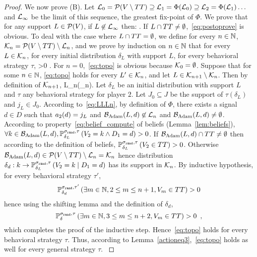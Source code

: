 \begin{proof}
We now prove (B).
Let
$\mathcal{L}_0=\mathcal{P}(V\setminus TT)\supseteq
\mathcal{L}_1=\Phi(\mathcal{L}_0)\supseteq \mathcal{L}_2=\Phi(\mathcal{L}_1)\ldots$ and $\mathcal{L}_\infty$
be the limit of this sequence, the greatest fix-point of $\Phi$.
  We
prove that for any support $L\in\mathcal{P}(V)$, if
$L\not\in\mathcal{L}_\infty$ then: \be\label{eq:postoprove} \enspace.  \ee If $L\cap TT
\not=\emptyset$,~\eqref{eq:postoprove} is obvious.  To deal with
the case where {$L\cap TT =\emptyset$}, we define for every
$n\in\mathbb{N}$, $\mathcal{K}_n = \mathcal{P}(V\setminus TT) \setminus \mathcal{L}_n$, and we
prove by induction on $n\in\mathbb{N}$ that for every $L\in\mathcal{K}_n$, for every
initial distribution $\delta_L$ with support $L$, for every {behavioral} strategy
$\tau$, \be\label{eq:topo} >0 \enspace.  \ee For
$n=0$,~\eqref{eq:topo} is obvious because $\mathcal{K}_0=\emptyset$.  Suppose
that for some $n\in\mathbb{N}$, \eqref{eq:topo} holds for every $L'\in\mathcal{K}_n$,
and let $L\in\mathcal{K}_{n+1}\setminus \mathcal{K}_n$.
Then by definition of $\mathcal{K}_{n+1}$, \be\label{eq:LLLn}
L\in\LL_{n}\bh\Phi(\LL_n)\enspace.  \ee Let $\delta_L$ be an initial
distribution with support $L$ and $\tau$ any behavioral strategy for player $2$.
Let $J_0\subseteq J$ be the support of $\tau(\delta_L)$ and $j_L\in J_0$.  According
to~\eqref{eq:LLLn}, by definition of $\Phi$, there exists a signal
$d\in D$ such that $a_2(d)=j_L$ and
 $\mathcal{B}_{\text{Adam}}(L,d)\not \in \mathcal{L}_n$ and $\mathcal{B}_{\text{Adam}}(L,d)\neq \emptyset$.
{According to  property~\eqref{eq:belief_compute} of beliefs (Lemma~\ref{lem:beliefs}),} 
 $\forall k \in \mathcal{B}_{\text{Adam}}(L,d),\mathbb{P}^{\sigma_{{\tt rand}},\tau}_{\delta_L}\left({V_2 =k\land D_1=d}\right)  > 0$.
   If
$\mathcal{B}_{\text{Adam}}(L,d)\cap TT \not= \emptyset$ then according to
the definition of beliefs,
$\mathbb{P}^{\sigma_{{\tt rand}},\tau}_{\delta_L}\left({V_2\in TT}\right)>0$.  Otherwise
$\mathcal{B}_{\text{Adam}}(L,d)\in\mathcal{P}(V\setminus TT)\setminus\mathcal{L}_n=\mathcal{K}_n$ hence
distribution $\delta_{d}:k\to \mathbb{P}^{\sigma_{{\tt rand}},\tau}_{\delta_L}\left({V_2 =k\mid D_1=d}\right)$
has its support in $\mathcal{K}_n$. By inductive hypothesis, for every
behavioral strategy $\tau'$,
\[\mathbb{P}^{\sigma_{{\tt rand}},\tau'}_{\delta_{d}}\left({\exists m\in\mathbb{N}, 2\leq
  m\leq n+1, V_m\in TT}\right)>0\]
hence using the shifting lemma and the
definition of $\delta_{d}$,
\[
\mathbb{P}^{\sigma_{{\tt rand}},\tau}_{\delta}\left({\exists m\in\mathbb{N},
  3\leq m\leq n+2, V_m\in TT}\right)>0\enspace,\]
which completes the proof of the inductive
step.
{
Hence~\eqref{eq:topo} holds for every behavioral strategy 
$\tau$. Thus, according to Lemma~\ref{actioneq3},~\eqref{eq:topo}
holds as well for every general strategy $\tau$.
}


\end{proof}
